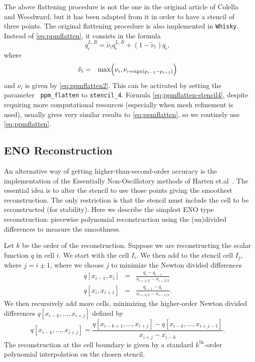 \documentclass{article}
\begin{document}
The above flattening procedure is not the one in the original article of Colella and Woodward, but
it has been adapted from it in order to have a stencil of three points.  The original flattening
procedure is also implemented in {\tt Whisky}. Instead of \ref{eq:ppmflatten}, it consists in the formula
\begin{equation}
  \label{eq:ppmflatten-stencil4}
  q_i^{L,R} = \tilde \nu_i q_i^{L,R} + (1 - \tilde \nu_i) q_i,
\end{equation}
where
\begin{eqnarray}
\tilde \nu_i &=& {\rm max}\Big(\nu_i,\nu_{i+{\rm sign}(p_{i-1}-p_{i+1})}\Big)
\end{eqnarray}
and $\nu_i$ is given by \ref{eq:ppmflatten2}. This can be activated by setting the parameter {\tt
ppm\_flatten} to {\tt stencil\_4}. Formula \ref{eq:ppmflatten-stencil4}, despite requiring
more computational resources (especially when mesh refinement is used), usually gives very similar
results to \ref{eq:ppmflatten}, so we routinely use \ref{eq:ppmflatten}.


\subsection{ENO Reconstruction}
\label{sec:eno}

An alternative way of getting higher-than-second-order accuracy is the implementation of the
Essentially Non-Oscillatory methods of Harten et.al~\cite{eno}. The
essential idea is to alter the stencil to use those points giving the
smoothest reconstruction. The only restriction is that the stencil
must include the cell to be reconstructed (for stability). Here we
describe the simplest ENO type reconstruction: piecewise polynomial
reconstruction using the (un)divided differences to measure the
smoothness. 

Let $k$ be the order of the reconstruction. Suppose we are
reconstructing the scalar function $q$ in cell $i$. We start with the
cell $I_i$. We then add to the stencil cell $I_j$, where $j = i \pm
1$, where we choose $j$ to minimize the Newton divided differences
\begin{eqnarray}
  \label{enodd}
  q \left[ x_{i-1}, x_i \right] & = & \frac{q_i - q_{i-1}}{x_{i+1/2}
    - x_{i-3/2}} \\
  q \left[ x_i, x_{i+1} \right] & = & \frac{q_{i+1} - q_i}{x_{i+3/2}
    - x_{i-1/2}}.
\end{eqnarray}
\noindent We then recursively add more cells, minimizing the higher-order 
Newton divided differences $q \left[ x_{i-k}, \dots, x_{i+j} \right]$
defined by 
\begin{equation}
  \label{enodd2}
  q \left[ x_{i-k}, \dots, x_{i+j} \right] = \frac{ q \left[ x_{i-k+1},
  \dots, x_{i+j} \right] - q \left[ x_{i-k}, \dots, x_{i+j-1} \right]
  }{x_{i+j} - x_{i-k}}.
\end{equation}
\noindent The reconstruction at the cell boundary is given by a
standard $k^{\textrm{th}}$-order polynomial interpolation on the chosen
stencil. 
\end{document}
